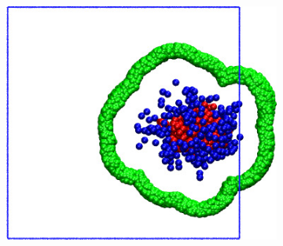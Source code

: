 \begin{figure}[b]
\begin{subfigure}{0.20\textwidth}
    \caption{}
  \end{subfigure}
  \hspace{15pt}
  \begin{subfigure}{0.20\textwidth}
    \includegraphics[height=0.9\textwidth]{AddToSystem-A-ld_hd.jpg}
    \caption{}
  \end{subfigure}


\end{figure}
